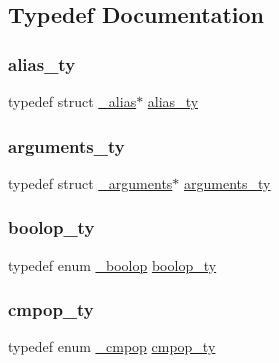 \subsection{Typedef Documentation}
\mbox{\label{_python-ast_8h_a01f738700190ffcf2da799b99e05cbd1}} 
\subsubsection{\texorpdfstring{alias\_ty}{alias\_ty}}
{\footnotesize\ttfamily typedef struct \mbox{\hyperlink{struct__alias}{\+\_\+alias}}$\ast$ \mbox{\hyperlink{_python-ast_8h_a01f738700190ffcf2da799b99e05cbd1}{alias\+\_\+ty}}}

\mbox{\label{_python-ast_8h_a45cc6e94d598fdc335d8c85739108a3e}} 
\subsubsection{\texorpdfstring{arguments\_ty}{arguments\_ty}}
{\footnotesize\ttfamily typedef struct \mbox{\hyperlink{struct__arguments}{\+\_\+arguments}}$\ast$ \mbox{\hyperlink{_python-ast_8h_a45cc6e94d598fdc335d8c85739108a3e}{arguments\+\_\+ty}}}

\mbox{\label{_python-ast_8h_ab7ba8d66d81017932471af1f2609a830}} 
\subsubsection{\texorpdfstring{boolop\_ty}{boolop\_ty}}
{\footnotesize\ttfamily typedef enum \mbox{\hyperlink{_python-ast_8h_a16067ed2b6546040536da29338709abf}{\+\_\+boolop}}  \mbox{\hyperlink{_python-ast_8h_ab7ba8d66d81017932471af1f2609a830}{boolop\+\_\+ty}}}

\mbox{\label{_python-ast_8h_aabeaddc9c86d689d06ce80e7ebb22789}} 
\subsubsection{\texorpdfstring{cmpop\_ty}{cmpop\_ty}}
{\footnotesize\ttfamily typedef enum \mbox{\hyperlink{_python-ast_8h_aeae2807c86997ffad2fa6d972a29ee1f}{\+\_\+cmpop}}  \mbox{\hyperlink{_python-ast_8h_aabeaddc9c86d689d06ce80e7ebb22789}{cmpop\+\_\+ty}}}

